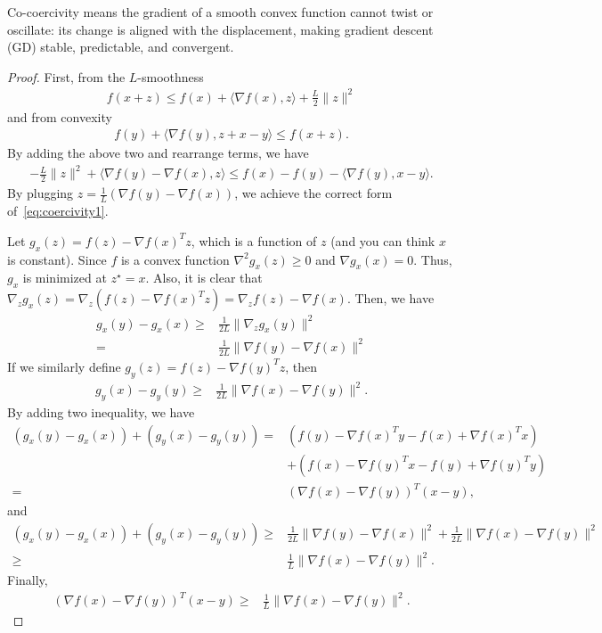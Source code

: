 \documentclass{article}
\begin{document}
Co-coercivity means the gradient of a smooth convex function cannot twist or oscillate:
its change is aligned with the displacement,
making gradient descent (GD) stable, predictable, and convergent.

\begin{proof}

First, from the $L$-smoothness
\begin{align}
    f(x+z) \leq f(x) + \langle \nabla f(x), z\rangle + \frac{L}{2}\|z\|^2
\end{align}
and from convexity
\begin{align}
    f(y) + \langle \nabla f(y), z+x-y\rangle \leq f(x+z).
\end{align}
By adding the above two and rearrange terms, we have
\begin{align}
-\frac{L}{2}\|z\|^2 + \langle \nabla f(y) - \nabla f(x), z\rangle \leq f(x)- f(y) - \langle \nabla f(y), x-y\rangle.
\end{align}
By plugging $z = \frac{1}{L}(\nabla f(y) - \nabla f(x))$, we achieve the correct form of~\eqref{eq:coercivity1}.


    Let $g_x(z) = f(z) - \nabla f(x)^T z$, which is a function of $z$ (and you can think $x$ is constant).
    Since $f$ is a convex function $\nabla^2 g_x(z) \geq 0$ and $\nabla g_x(x) = 0$.
    Thus, $g_x$ is minimized at $z^\star=x$.
    Also, it is clear that $\nabla_z g_x(z) = \nabla_z(f(z) - \nabla f(x)^T z) = \nabla_z f(z) - \nabla f(x)$.
    Then, we have
    \begin{align}
        g_x(y) - g_x(x) \geq& \frac{1}{2L} \|\nabla_z g_x(y)\|^2\\
        =& \frac{1}{2L} \|\nabla f(y) - \nabla f(x)\|^2
    \end{align}
    If we similarly define $g_y(z) = f(z) - \nabla f(y)^T z$, then
    \begin{align}
        g_y(x) - g_y(y) \geq& \frac{1}{2L} \|\nabla f(x) - \nabla f(y)\|^2.
    \end{align}
    By adding two inequality, we have
    \begin{align}
        (g_x(y) - g_x(x)) + (g_y(x) - g_y(y))
        =& \left(f(y) -\nabla f(x)^T y  - f(x) + \nabla f(x)^Tx \right)\nonumber\\
        &+ \left(f(x) - \nabla f(y)^T x - f(y) +\nabla f(y)^T y\right)\\
        =& (\nabla f(x) - \nabla f(y))^T (x-y),
    \end{align}
    and
    \begin{align}
        (g_x(y) - g_x(x)) + (g_y(x) - g_y(y))
        \geq &\frac{1}{2L} \|\nabla f(y) - \nabla f(x)\|^2+ \frac{1}{2L} \|\nabla f(x) - \nabla f(y)\|^2\\
        \geq &\frac{1}{L} \|\nabla f(x) - \nabla f(y)\|^2.
    \end{align}
    Finally, 
    \begin{align}
        (\nabla f(x) - \nabla f(y))^T (x-y) \geq &\frac{1}{L} \|\nabla f(x) - \nabla f(y)\|^2.
    \end{align}
\end{proof}
\end{document}
